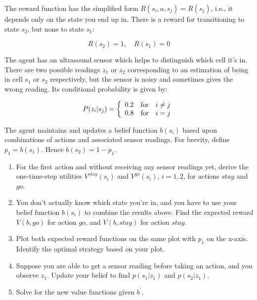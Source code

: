 \documentclass[12pt]{article}
\begin{document}
\noindent
The reward function has the simplified form $R(s_i,a,s_j) = R(s_j)$,
i.e., it depends only on the state you end up in.  There is a reward
for transitioning to state $s_2$, but none to state $s_1$:

$$R(s_2) = 1, \quad R(s_1) = 0$$

\noindent
The agent has an ultrasound sensor which helps to distinguish which
cell it's in.  There are two possible readings $z_1$ or $z_2$
corresponding to an estimation of being in cell $s_1$ or $s_2$
respectively, but the sensor is noisy and sometimes gives the wrong
reading.  Its conditional probability is given by:

$$P(z_i | s_j) = \left\{ \begin{array}{lll}
                                   0.2 & \hbox{for} & i\neq j \\
                                   0.8 & \hbox{for} & i = j
                            \end{array}
                    \right.$$

\noindent
The agent maintains and updates a belief function $b(s_i)$ based upon
combinations of actions and associated sensor readings.  For brevity,
define $p_1 = b(s_1)$.  Hence $b(s_2) = 1 - p_1$.

\begin{enumerate}

\item For the first action and without receiving any sensor readings
  yet, derive the one-time-step utilities $V^{stay}(s_i)$ and
  $V^{go}(s_i)$, $i=1,2$, for actions $stay$ and $go$.

\item You don't actually know which state you're in, and you have to
  use your belief function $b(s_i)$ to combine the results above.
  Find the expected reward $V(b,go)$ for action $go$, and $V(b,stay)$
  for action $stay$.

\item Plot both expected reward functions on the same plot with $p_1$
  on the x-axis.  Identify the optimal strategy based on your plot.

\item Suppose you are able to get a sensor reading before taking an
  action, and you observe $z_1$.  Update your belief to find $p(s_1 |
  z_1)$ and $p(s_2 | z_1)$.

\item Solve for the new value functions given $b^{\prime}$.

\end{enumerate}
 
\end{document}
